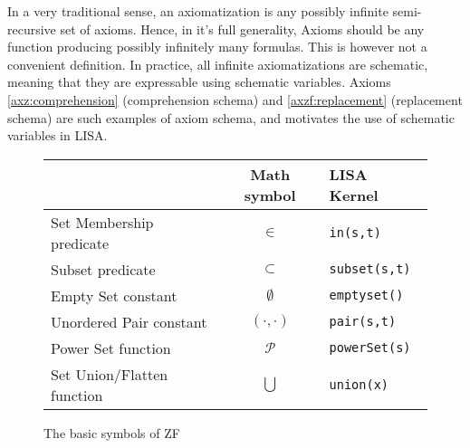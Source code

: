 In a very traditional sense, an axiomatization is any possibly infinite semi-recursive set of axioms. Hence, in it's full generality, Axioms should be any function producing possibly infinitely many formulas.
This is however not a convenient definition. In practice, all infinite axiomatizations are schematic, meaning that they are expressable using schematic variables. Axioms \ref{axz:comprehension} (comprehension schema) and \ref{axzf:replacement} (replacement schema) are such examples of axiom schema, and motivates the use of schematic variables in LISA.



\begin{figure}
\begin{center}
\begin{tabular}{l|c|l}
{} & Math symbol & LISA Kernel\\ \hline
Set Membership predicate & $\in$ & \lstinline$in(s,t)$\\
Subset predicate & $\subset$ & \lstinline$subset(s,t)$ \\
Empty Set constant & $\emptyset$ & \lstinline$emptyset()$ \\
Unordered Pair constant & $(\cdot, \cdot )$ & \lstinline$pair(s,t)$ \\
Power Set function & $\mathcal P$ & \lstinline$powerSet(s)$ \\
Set Union/Flatten function & $\bigcup$ & \lstinline$union(x)$ \\
\end{tabular}
\caption{The basic symbols of ZF}
\label{fig:symbolszf}
\end{center}
\end{figure}

